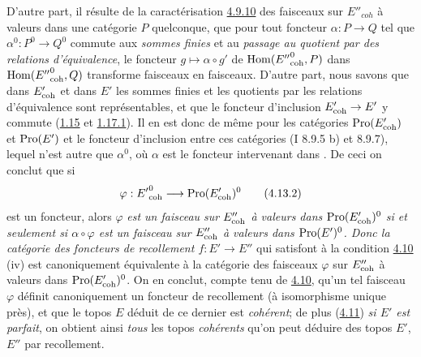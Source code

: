 \documentclass[10pt]{../fichiers-configuration-latex/smfart}
\begin{document}
D'autre part, il résulte de la caractérisation \hyperref[VI.subsubsec4.9.10]{4.9.10} des faisceaux
sur $E''_{coh}$ à valeurs dans une catégorie $P$ quelconque, que
pour tout foncteur $\alpha : P \to Q$ tel que $\alpha^{0} : P^0 \to
Q^0$ commute aux \emph{sommes finies} et au \pageoriginale
\emph{passage au quotient par des relations d'équivalence}, le foncteur $g \mapsto \alpha
\circ g'$ de $\operatorname{Hom}({E''}^0_{\mathrm{coh}}, P)$ dans $\operatorname{Hom}({E''}^0_{\mathrm{coh}},
Q)$ transforme faisceaux en faisceaux. D'autre part, nous savons que
dans $E'_{\mathrm{coh}}$ et dans $E'$ les sommes finies et les quotients
par les relations d'équivalence sont représentables, et que le
foncteur d'inclusion $E'_{\coh} \to E'$ y commute (\hyperref[VI.cor1.15]{1.15} et
\hyperref[VI.cor1.17.1]{1.17.1}). Il en est donc de même pour les catégories
$\operatorname{Pro}(E'_{\mathrm{coh}})$ et $\operatorname{Pro}(E')$ et le foncteur d'inclusion entre ces
catégories (I 8.9.5 b) et 8.9.7), lequel n'est autre que $\alpha^{0}$,
où $\alpha$ est le foncteur intervenant dans
. De ceci on
conclut que si
\begin{equation*}
\varphi : {E'}^0_{\coh} \to \Pro (E'_{\coh})^0\tag{4.13.2}
\end{equation*}
est un foncteur, alors $\varphi$ \emph{est un faisceau sur
$E''_{\mathrm{coh}}$ à valeurs dans $\operatorname{Pro}(E'_{\mathrm{coh}})^0$ si et seulement si
$\alpha \circ \varphi$ est un faisceau sur $E''_{\mathrm{coh}}$ à valeurs
dans $\operatorname{Pro}(E')^{0}$. Donc la catégorie des foncteurs de recollement
$f : E'\to E''$} qui satisfont à la condition \hyperref[VI.prop4.10]{4.10} (iv)
est canoniquement équivalente à la catégorie des faisceaux $\varphi$
sur $E''_{\mathrm{coh}}$ à valeurs dans $\operatorname{Pro}(E'_{\mathrm{coh}})^0$. On en conclut,
compte tenu de \hyperref[VI.prop4.10]{4.10}, qu'un tel faisceau $\varphi$
définit canoniquement un foncteur de recollement (à isomorphisme
unique près), et  que le topos $E$ déduit de ce dernier est
\emph{cohérent}; de plus (\hyperref[VI.cor4.11]{4.11}) \emph{si $E'$ est
parfait}, on obtient ainsi \emph{tous} les topos \emph{cohérents}
qu'on peut déduire des topos $E'$, $E''$ par recollement.
\end{document}

